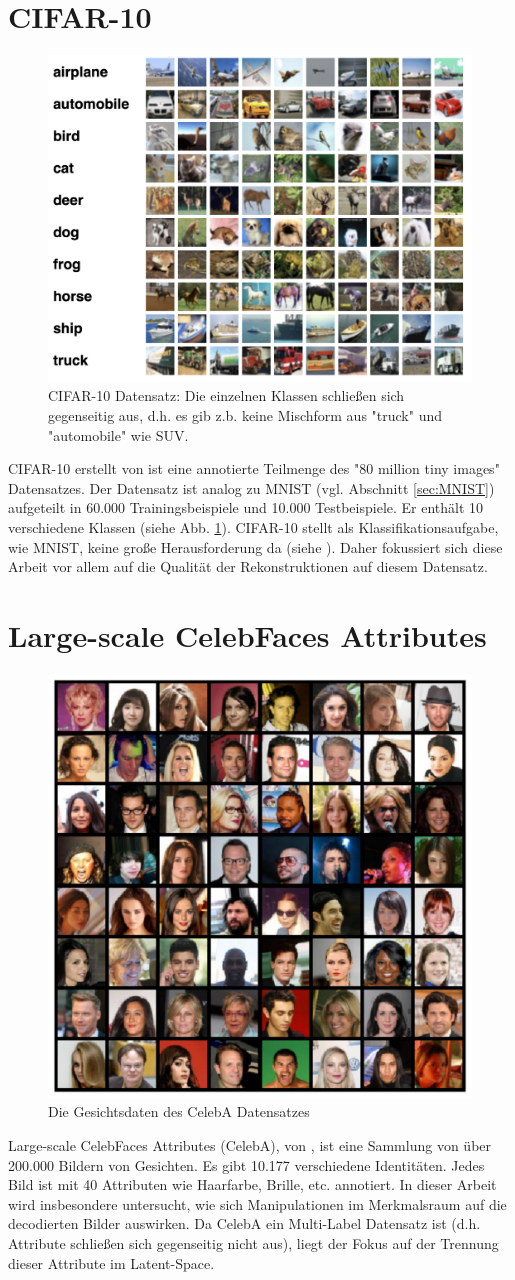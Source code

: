 \section{CIFAR-10}
\begin{figure}[hbt]
  \centering
  \includegraphics[width=.55\textwidth]{gfx/datasets/cifar10_dataset}
  \caption{CIFAR-10 Datensatz: Die einzelnen Klassen schließen sich gegenseitig aus, d.h. es gib z.b. keine Mischform aus "truck" und "automobile" wie SUV.}
  \label{fig:CIFAR_10_dataset}
\end{figure}
CIFAR-10 erstellt von \cite{cifar-orig} ist eine annotierte Teilmenge des "80 million tiny images" Datensatzes. Der Datensatz ist analog zu MNIST (vgl. Abschnitt \ref{sec:MNIST}) aufgeteilt in 60.000 Trainingsbeispiele und 10.000 Testbeispiele. Er enthält 10 verschiedene Klassen (siehe Abb. \ref{fig:CIFAR_10_dataset}). CIFAR-10 stellt als Klassifikationsaufgabe, wie MNIST, keine große Herausforderung da (siehe \cite{foret2021sharpnessaware}). Daher fokussiert sich diese Arbeit vor allem auf die Qualität der Rekonstruktionen auf diesem Datensatz.



\section{Large-scale CelebFaces Attributes}
\begin{figure}[hbt]
  \centering
  \includegraphics[width=.4\textwidth]{gfx/datasets/real}
  \caption{Die Gesichtsdaten des CelebA Datensatzes}
\end{figure}

Large-scale CelebFaces Attributes (CelebA), von \cite{liu2015faceattributes}, ist eine Sammlung von über 200.000 Bildern von Gesichten. Es gibt 10.177 verschiedene Identitäten. Jedes Bild ist mit 40 Attributen wie Haarfarbe, Brille, etc. annotiert. In dieser Arbeit wird insbesondere untersucht, wie sich Manipulationen im Merkmalsraum auf die decodierten Bilder auswirken. Da CelebA ein Multi-Label Datensatz ist (d.h. Attribute schließen sich gegenseitig nicht aus), liegt der Fokus auf der Trennung dieser Attribute im Latent-Space.
